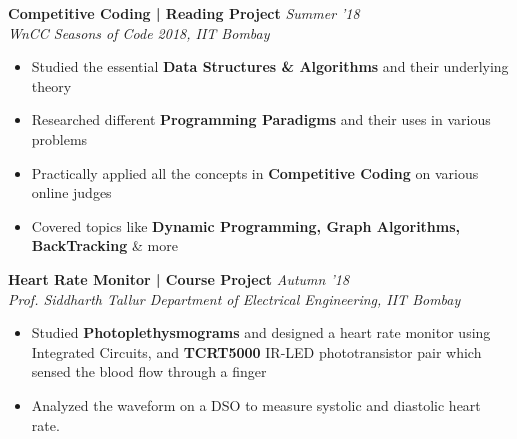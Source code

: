 \documentclass[11pt]{article}%
\begin{document}
{\flushleft \bf \large{Competitive Coding | Reading Project}} \hfill {{{\em{Summer '18}}}} \\
{\em{WnCC Seasons of Code 2018, IIT Bombay}}
\vspace{-1mm}
\begin{itemize}
\setlength\itemsep{0.01em}
\vspace{-1mm}
\item Studied the essential {\bf Data Structures \& Algorithms} and their underlying theory 
\vspace{-1mm}
\item Researched different {\bf Programming Paradigms} and their uses in various problems
\vspace{-1mm}
\item Practically applied all the concepts in {\bf Competitive Coding} on various online judges
\vspace{-1mm}
\item Covered topics like {\bf Dynamic Programming, Graph Algorithms, BackTracking} \& more
\end{itemize}
\vspace{-0.5cm}

{\flushleft \bf \large{Heart Rate Monitor | Course Project}} \hfill  \hfill {{\em{Autumn '18} }}\\
{\em{Prof. Siddharth Tallur \textbar Department of Electrical Engineering, IIT Bombay}}
\begin{itemize}
\vspace{-2mm}
\setlength\itemsep{0.01em}
\item Studied {\bf Photoplethysmograms} and designed a heart rate monitor using Integrated Circuits, and {\bf TCRT5000} IR-LED phototransistor pair which sensed the blood flow through a finger
\vspace{-1.2mm}
\item Analyzed the waveform on a DSO to measure systolic and diastolic heart rate.
\vspace{-1.2mm}
\end{itemize}
\vspace{-0.4cm}
\end{document}
